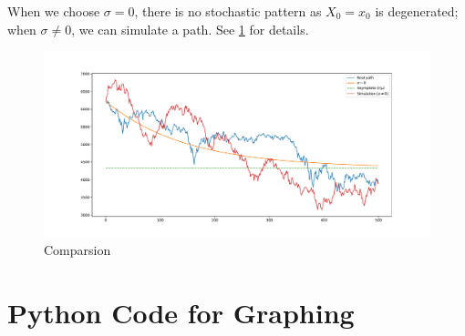 \documentclass{homework}
\begin{document}
    When we choose $\sigma=0$, there is no stochastic pattern
    as $X_0=x_0$ is degenerated;
    when $\sigma\neq 0$, we can simulate a path.
    See \cref{fig:p5} for details.
    \begin{figure}[h]
        \centering
        \includegraphics[width=\textwidth]{figure}
        \caption{Comparsion}
        \label{fig:p5}
    \end{figure}

    \newpage
    \appendix
    \section{Python Code for Graphing}
    
\end{document}
